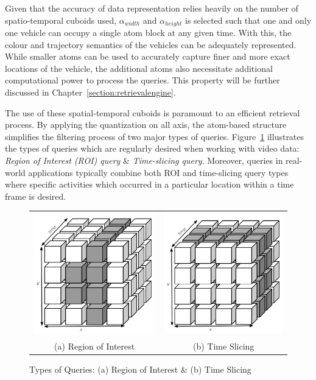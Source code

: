 Given that the accuracy of data representation relies heavily on the number of spatio-temporal cuboids used, $\alpha_{width}$ and $\alpha_{height}$ is selected such that one and only one vehicle can occupy a single atom block at any given time. With this, the colour and trajectory semantics of the vehicles can be adequately represented.
While smaller atoms can be used to accurately capture finer and more exact locations of the vehicle, the additional atoms also necessitate additional computational power to process the queries. This property will be further discussed in Chapter~\ref{section:retrievalengine}.

The use of these spatial-temporal cuboids is paramount to an efficient retrieval process. 
By applying the quantization on all axis, the atom-based structure simplifies the filtering process of two major types of queries.
Figure~\ref{fig:typesofQuery} illustrates the types of queries which are regularly desired when working with video data: \textit{Region of Interest (ROI) query} \& \textit{Time-slicing query}.
Moreover, queries in real-world applications typically combine both ROI and time-slicing query types where specific activities which occurred in a particular location within a time frame is desired.

\begin{figure}[htb!]
  \centering
  \begin{tabular}{cc}
  \includegraphics[width=0.3\linewidth]{image/general/atom_ROI.PNG} &
  \includegraphics[width=0.3\linewidth]{image/general/atom_time_slicing.PNG}\\
  (a) Region of Interest & (b) Time Slicing
  \end{tabular}
  \caption{Types of Queries: (a) Region of Interest \& (b) Time Slicing}
  \label{fig:typesofQuery}
\end{figure}

